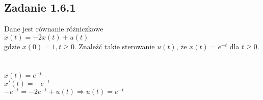 \pagebreak
\subsection*{Zadanie 1.6.1} {\color{darkgray}
	Dane jest równanie różniczkowe\\
	$\dot{x}(t)=-2x(t)+u(t)$\\
	gdzie $x(0)=1, t\geqslant 0$. Znaleźć takie sterowanie $u(t)$, że $x(t)=e^{-t}$ dla $t \geqslant 0$.\\
}\lineh
\\\\
$x(t)=e^{-t}$\\
$x'(t)=-e^{-t}$\\
$-e^{-t}=-2e^{-t}+u(t) \Rightarrow \boxed{u(t)=e^{-t}}$\\

\pagebreak
